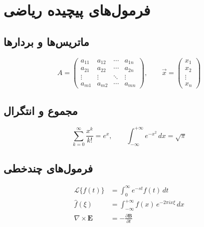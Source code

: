 \documentclass[12pt,a4paper,twoside]{book}
\begin{document}
\section{فرمول‌های پیچیده ریاضی}
\label{sec:mathformulas}

\subsection{ماتریس‌ها و بردارها}

\begin{equation}
  A = \begin{pmatrix}
    a_{11} & a_{12} & \cdots & a_{1n} \\
    a_{21} & a_{22} & \cdots & a_{2n} \\
    \vdots & \vdots & \ddots & \vdots \\
    a_{m1} & a_{m2} & \cdots & a_{mn}
  \end{pmatrix}
  ,\qquad
  \vec{x} = \begin{pmatrix} x_1 \\ x_2 \\ \vdots \\ x_n \end{pmatrix}
  \label{eq:matrix}
\end{equation}

\subsection{مجموع و انتگرال}

\begin{equation}
  \sum_{k=0}^{\infty} \frac{x^k}{k!} = e^x
  ,\qquad
  \int_{-\infty}^{+\infty} e^{-x^2}\,dx = \sqrt{\pi}
  \label{eq:series-integral}
\end{equation}

\subsection{فرمول‌های چندخطی}

\begin{align}
  \mathcal{L}\{f(t)\} &= \int_{0}^{\infty} e^{-st} f(t)\,dt
    \label{eq:laplace} \\
  \hat{f}(\xi) &= \int_{-\infty}^{+\infty}
    f(x)\,e^{-2\pi i x\xi}\,dx
    \label{eq:fourier} \\
  \nabla \times \mathbf{E} &= -\frac{\partial \mathbf{B}}{\partial t}
    \label{eq:maxwell}
\end{align}
\end{document}
